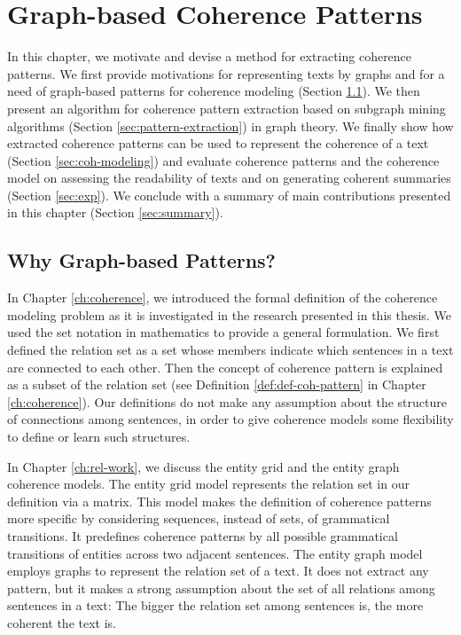 
\chapter{Graph-based Coherence Patterns}
\label{ch:coh-patterns}

In this chapter, we motivate and devise a method for extracting coherence patterns.  
We first provide motivations for representing texts by graphs and for a need of graph-based patterns for coherence modeling (Section \ref{sec:motivation}).  
We then present an algorithm for coherence pattern extraction based on subgraph mining algorithms (Section \ref{sec:pattern-extraction}) in graph theory.  
We finally show how extracted coherence patterns can be used to represent the coherence of a text (Section \ref{sec:coh-modeling}) and evaluate coherence patterns and the coherence model on assessing the readability of texts and on generating coherent summaries (Section \ref{sec:exp}). 
We conclude with a summary of main contributions presented in this chapter (Section \ref{sec:summary}). 

\section{Why Graph-based Patterns?}
\label{sec:motivation}

In Chapter \ref{ch:coherence}, we introduced the formal definition of the coherence modeling problem as it is investigated in the research presented in this thesis. 
We used the set notation in mathematics to provide a general formulation. 
We first defined the relation set as a set whose members indicate which sentences in a text are connected to each other. 
Then the concept of coherence pattern is explained as a subset of the relation set (see Definition \ref{def:def-coh-pattern} in Chapter \ref{ch:coherence}). 
Our definitions do not make any assumption about the structure of connections among sentences, in order to give coherence models some flexibility to define or learn such structures. 

In Chapter \ref{ch:rel-work}, we discuss the entity grid 
\cite{barzilay05a,barzilay08} and the entity graph 
\cite{guinaudeau13} coherence models. 
The entity grid model represents the relation set in our definition via a matrix. 
This model makes the definition of coherence patterns more specific by considering sequences, instead of sets, of grammatical transitions.  
It predefines coherence patterns by all possible grammatical transitions of entities across two adjacent sentences. 
The entity graph model employs graphs to represent the relation set of a text.  
It does not extract any pattern, but it makes a strong assumption about the set of all relations among sentences in a text: The bigger the relation set among sentences is, the more coherent the text is. 

